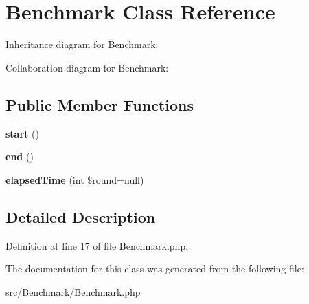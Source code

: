 \hypertarget{class_zest_1_1_benchmark_1_1_benchmark}{}\section{Benchmark Class Reference}
\label{class_zest_1_1_benchmark_1_1_benchmark}


Inheritance diagram for Benchmark\+:


Collaboration diagram for Benchmark\+:
\subsection*{Public Member Functions}
\begin{DoxyCompactItemize}
\item 
\mbox{\label{class_zest_1_1_benchmark_1_1_benchmark_af8fa59992209e36dccb3eefb0f75531f}} 
{\bfseries start} ()
\item 
\mbox{\label{class_zest_1_1_benchmark_1_1_benchmark_a817082ace0e2589d27b22890290aa4a9}} 
{\bfseries end} ()
\item 
\mbox{\label{class_zest_1_1_benchmark_1_1_benchmark_a5f11bdeb7724a33273ab66507bc97b01}} 
{\bfseries elapsed\+Time} (int \$round=null)
\end{DoxyCompactItemize}


\subsection{Detailed Description}


Definition at line 17 of file Benchmark.\+php.



The documentation for this class was generated from the following file\+:\begin{DoxyCompactItemize}
\item 
src/\+Benchmark/Benchmark.\+php\end{DoxyCompactItemize}
